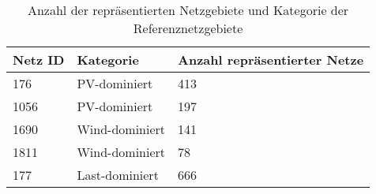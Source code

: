 {
\renewcommand{\arraystretch}{1.2}%
\begin{table}[H]
	\begin{center}
		\caption{Anzahl der repräsentierten Netzgebiete und Kategorie der Referenznetzgebiete}
		\begin{tabu} to 0.7\textwidth {X[0.6] X[1] X[1.5, r] }
			\toprule
			Netz ID    & Kategorie      & Anzahl repräsentierter Netze \\ \midrule
			\num{176}  & PV-dominiert   & \num{413}                    \\
			\num{1056} & PV-dominiert   & \num{197}                    \\
			\num{1690} & Wind-dominiert & \num{141}                    \\
			\num{1811} & Wind-dominiert & \num{78}                     \\
			\num{177}  & Last-dominiert & \num{666}                    \\ \bottomrule
		\end{tabu}
		\label{tab:grid_IDs}
	\end{center}
	\vspace{-3mm}%
\end{table}
}